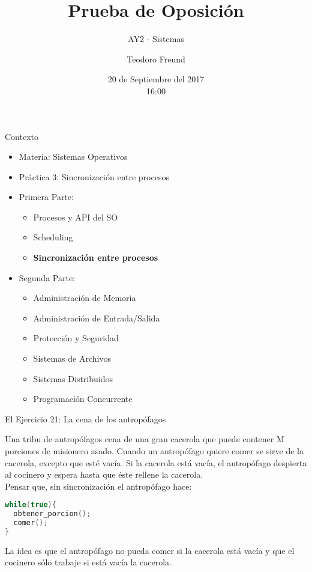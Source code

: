 \documentclass[presentation]{beamer}
\title{Prueba de Oposición}
\subtitle{AY2 - Sistemas}
\author{\large{Teodoro Freund}}
\date{20 de Septiembre del 2017 \\ \footnotesize{16:00}} %
\begin{document}
\begin{frame}
\titlepage
\end{frame}

\begin{frame}{Contexto}
\begin{itemize}
\item Materia: Sistemas Operativos
\pause
\item Práctica 3: Sincronización entre procesos
\pause
\item Primera Parte:
\begin{itemize}
\item Procesos y API del SO
\item Scheduling
\pause
\item \textbf{Sincronización entre procesos}
\pause
\end{itemize}
\item Segunda Parte:
\begin{itemize}
\item Administración de Memoria

\item Administración de Entrada/Salida
\item Protección y Seguridad
\item Sistemas de Archivos
\item Sistemas Distribuidos
\item Programación Concurrente
\end{itemize}
\end{itemize}

\end{frame}

\begin{frame}[fragile]{El Ejercicio 21: La cena de los antropófagos}

Una tribu de antropófagos cena de una gran cacerola que puede contener M porciones de misionero asado. Cuando un antropófago quiere comer se sirve de la cacerola, excepto que esté vacía. Si la cacerola está vacía, el antropófago despierta al cocinero y espera hasta que éste rellene la cacerola.\\


Pensar que, sin sincronización el antropófago hace:



\begin{lstlisting}[language=C++]
while(true){
  obtener_porcion();
  comer();
}
\end{lstlisting}

La idea es que el antropófago no pueda comer si la cacerola está vacía y que el cocinero sólo trabaje si está vacía la cacerola.

\end{frame}
\end{document}
